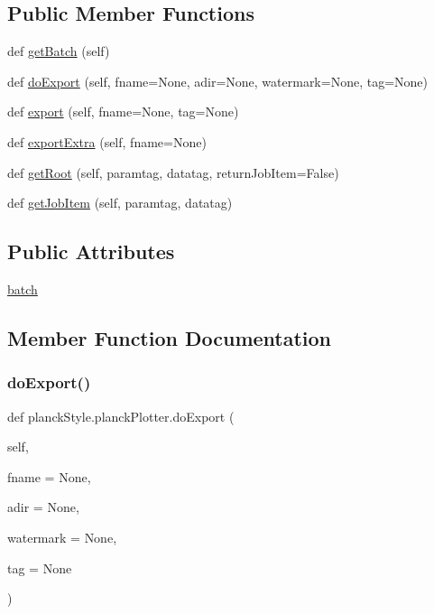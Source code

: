 \subsection*{Public Member Functions}
\begin{DoxyCompactItemize}
\item 
def \mbox{\hyperlink{classplanckStyle_1_1planckPlotter_ab9158e2b20b79b95d140e172c0054574}{get\+Batch}} (self)
\item 
def \mbox{\hyperlink{classplanckStyle_1_1planckPlotter_addb6a7ed876802d0523c21dd66aa0138}{do\+Export}} (self, fname=None, adir=None, watermark=None, tag=None)
\item 
def \mbox{\hyperlink{classplanckStyle_1_1planckPlotter_a0100970f877b5a5267dc1e3dcde09111}{export}} (self, fname=None, tag=None)
\item 
def \mbox{\hyperlink{classplanckStyle_1_1planckPlotter_a0097bf752f839ecc435362ff049c751e}{export\+Extra}} (self, fname=None)
\item 
def \mbox{\hyperlink{classplanckStyle_1_1planckPlotter_a1f04dabee2f8f9fe8c4a8fcabdedb346}{get\+Root}} (self, paramtag, datatag, return\+Job\+Item=False)
\item 
def \mbox{\hyperlink{classplanckStyle_1_1planckPlotter_a5a2ce78f310b8ca51fc307a1c66c5e6d}{get\+Job\+Item}} (self, paramtag, datatag)
\end{DoxyCompactItemize}
\subsection*{Public Attributes}
\begin{DoxyCompactItemize}
\item 
\mbox{\hyperlink{classplanckStyle_1_1planckPlotter_afdb5051848bcb1499284cfc17e3eb399}{batch}}
\end{DoxyCompactItemize}


\subsection{Member Function Documentation}
\mbox{\label{classplanckStyle_1_1planckPlotter_addb6a7ed876802d0523c21dd66aa0138}} 
\subsubsection{\texorpdfstring{do\+Export()}{doExport()}}
{\footnotesize\ttfamily def planck\+Style.\+planck\+Plotter.\+do\+Export (\begin{DoxyParamCaption}\item[{}]{self,  }\item[{}]{fname = {\ttfamily None},  }\item[{}]{adir = {\ttfamily None},  }\item[{}]{watermark = {\ttfamily None},  }\item[{}]{tag = {\ttfamily None} }\end{DoxyParamCaption})}



